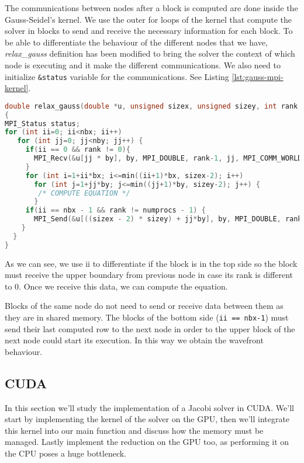 \documentclass[a4paper, 10pt]{article}
\begin{document}
The communications between nodes after a block is computed are done inside the Gauss-Seidel's kernel. We use the outer for loops of the kernel that compute the solver in blocks to send and receive the necessary information for each block. To be able to differentiate the behaviour of the different nodes that we have, \textit{relax\_gauss} definition has been modified to bring the solver the context of which node is executing and it make the different communications. We also need to initialize \texttt{\&status} variable for the communications. See Listing \ref{lst:gauss-mpi-kernel}.

\begin{lstlisting}[language=c, caption={Communications between nodes Gauss-Seidel inside kernel}, label={lst:gauss-mpi-kernel}]
double relax_gauss(double *u, unsigned sizex, unsigned sizey, int rank, int numprocs) //rank and numprocs passed as parameters
{
MPI_Status status;
for (int ii=0; ii<nbx; ii++)
   for (int jj=0; jj<nby; jj++) {
     if(ii == 0 && rank != 0){
       MPI_Recv(&u[jj * by], by, MPI_DOUBLE, rank-1, jj, MPI_COMM_WORLD, &status);
     }
     for (int i=1+ii*bx; i<=min((ii+1)*bx, sizex-2); i++) 
       for (int j=1+jj*by; j<=min((jj+1)*by, sizey-2); j++) {
        /* COMPUTE EQUATION */
       }
     if(ii == nbx - 1 && rank != numprocs - 1) {
       MPI_Send(&u[((sizex - 2) * sizey) + jj*by], by, MPI_DOUBLE, rank+1, jj, MPI_COMM_WORLD);
    }
  } 
}
\end{lstlisting}

As we can see, we use ii to differentiate if the block is in the top side so the block must receive the upper boundary from previous node in case its rank is different to 0. Once we receive this data, we can compute the equation.

Blocks of the same node do not need to send or receive data between them as they are in shared memory. The blocks of the bottom side (\texttt{ii == nbx-1}) must send their last computed row to the next node in order to the upper block of the next node could start its execution. In this way we obtain the wavefront behaviour.


\clearpage

\subsection{CUDA}

In this section we'll study the implementation of a Jacobi solver in CUDA. We'll start by implementing 
the kernel of the solver on the GPU, then we'll integrate this kernel into our main function and 
discuss how the memory must be managed. Lastly implement the reduction on the GPU too, as performing it
on the CPU poses a huge bottleneck.
\end{document}
